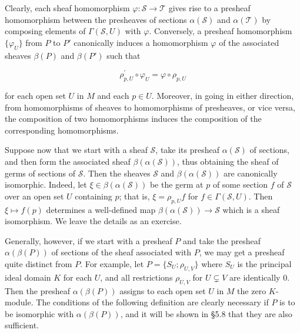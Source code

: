 Clearly, each sheaf homomorphism $\varphi\colon\mathcal{S}\to\mathcal{T}$ gives rise to a presheaf homomorphism between the presheaves of sections $\alpha(\mathcal{S})$ and $\alpha(\mathcal{T})$ by composing elements of $\Gamma(\mathcal{S},U)$ with $\varphi$. Conversely, a presheaf homomorphism $\{\varphi_U\}$ from $P$ to $P'$ canonically induces a homomorphism $\varphi$ of the associated sheaves $\beta(P)$ and $\beta(P')$ such that

\begin{equation}
\tag{9}\label{eq:5.6:9}
\rho_{p,U}^{\prime}\circ\varphi_{U}=\varphi\circ\rho_{p,U}
\end{equation}

for each open set $U$ in $M$ and each $p \in U$. Moreover, in going in either direction, from homomorphisms of sheaves to homomorphisms of presheaves, or vice versa, the composition of two homomorphisms induces the composition of the corresponding homomorphisms.

Suppose now that we start with a sheaf $\mathcal{S}$, take its presheaf $\alpha(\mathcal{S})$ of sections, and then form the associated sheaf $\beta(\alpha(\mathcal{S}))$, thus obtaining the sheaf of germs of sections of $\mathcal{S}$. Then the sheaves $\mathcal{S}$ and $\beta(\alpha(\mathcal{S}))$ are canonically isomorphic. Indeed, let $\xi \in \beta(\alpha(\mathcal{S}))$ be the germ at $p$ of some section $f$ of $\mathcal{S}$ over an open set $U$ containing $p$; that is, $\xi = \rho_{p,U}f$ for $f \in \Gamma(\mathcal{S}, U)$. Then $\xi \mapsto f(p)$ determines a well-defined map $\beta(\alpha(\mathcal{S})) \to \mathcal{S}$ which is a sheaf isomorphism. We leave the details as an exercise.

Generally, however, if we start with a presheaf $P$ and take the presheaf $\alpha(\beta(P))$ of sections of the sheaf associated with $P$, we may get a presheaf quite distinct from $P$. For example, let $P = \{S_U; \rho_{U,V}\}$ where $S_U$ is the principal ideal domain $K$ for each $U$, and all restrictions $\rho_{U,V}$ for $U \subsetneq V$ are identically 0. Then the presheaf $\alpha(\beta(P))$ assigns to each open set $U$ in $M$ the zero $K$-module. The conditions of the following definition are clearly necessary if $P$ is to be isomorphic with $\alpha(\beta(P))$, and it will be shown in §5.8 that they are also sufficient.

